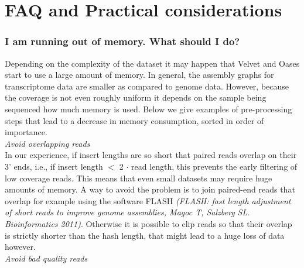 \documentclass[12pt]{article}
\begin{document}
\section{FAQ and Practical considerations}

\subsubsection*{I am running out of memory. What should I do?}
Depending on the complexity of the dataset it may happen that Velvet and Oases start to use a large amount of memory. In general, the assembly graphs for transcriptome data are smaller as compared to genome data. However, because the coverage is not even roughly uniform it depends on the sample being sequenced how much memory is used. Below we give examples of pre-processing steps that lead to a decrease in memory consumption, sorted in order of importance. \\

\emph{Avoid overlapping reads} \\

In our experience, if insert lengths are so short that paired reads overlap on their 3' ends, i.e., if insert length $<$ 2 $\cdot$ read length, this prevents the early filtering of low coverage reads. This means that even small datasets may require huge amounts of memory. A way to avoid the problem is to join paired-end reads that overlap for example using the software FLASH \emph{(FLASH: fast length adjustment of short reads to improve genome assemblies, Magoc T, Salzberg SL. Bioinformatics 2011)}. Otherwise it is possible to clip reads so that their overlap is strictly shorter than the hash length, that might lead to a huge loss of data however. \\

\emph{Avoid bad quality reads} \\
\end{document}
